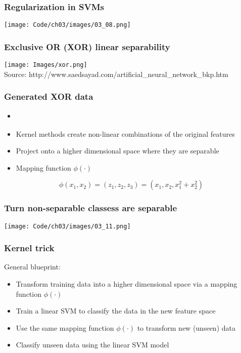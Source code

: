\documentclass{beamer}
\begin{document}
\begin{frame}
  \frametitle{Regularization in SVMs}
  \texttt{[image: Code/ch03/images/03\_08.png]}
\end{frame}

\begin{frame}
  \frametitle{Exclusive OR (XOR) linear separability}
  \texttt{[image: Images/xor.png]}
  \\
  \tiny{Source: http://www.saedsayad.com/artificial\_neural\_network\_bkp.htm}
\end{frame}

\begin{frame}
  \frametitle{Generated XOR data}
  \begin{itemize}
  \item \href{https://github.com/rasbt/python-machine-learning-book/blob/master/code/ch03/ch03.ipynb}{}
  \item Kernel methods create non-linear combinations of the original features
  \item Project onto a higher dimensional space where they are separable
  \item Mapping function $\phi(\cdot)$
  \end{itemize}
  \[
  \phi(x_1, x_2) = (z_1, z_2, z_3) = (x_1, x_2, x_{1}^{2} + x_{2}^{2})
  \]
\end{frame}

\begin{frame}
  \frametitle{Turn non-separable classess are separable}
  \texttt{[image: Code/ch03/images/03\_11.png]}
\end{frame}

\begin{frame}
  \frametitle{Kernel trick}
  General blueprint:
  \begin{itemize}
  \item Transform training data into a higher dimensional space via a mapping function $\phi(\cdot)$
  \item Train a linear SVM to classify the data in the new feature space
  \item Use the same mapping function $\phi(\cdot)$ to transform new (unseen) data
  \item Classify unseen data using the linear SVM model
  \end{itemize}
\end{frame}
\end{document}
